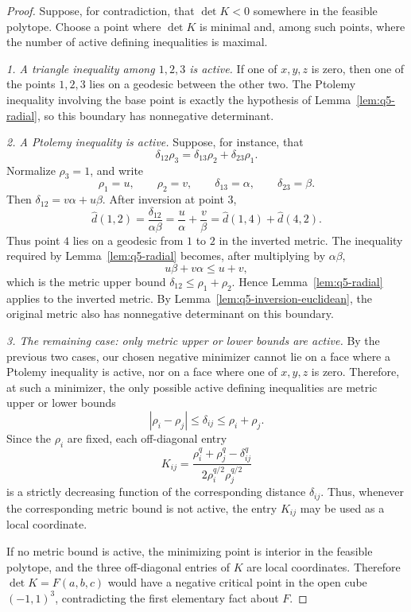 \documentclass[12pt]{amsart}
\theoremstyle{definition}
\newcommand{\1}{\mathbf{1}}
\begin{document}
\begin{proof}
Suppose, for contradiction, that $\det K<0$ somewhere in the feasible polytope.
Choose a point where $\det K$ is minimal and, among such points, where the number of
active defining inequalities is maximal.

\smallskip
\noindent\emph{1. A triangle inequality among $1,2,3$ is active.}
If one of $x,y,z$ is zero, then one of the points $1,2,3$ lies on a geodesic
between the other two.  The Ptolemy inequality involving the base point is exactly the
hypothesis of Lemma~\ref{lem:q5-radial}, so this boundary has nonnegative determinant.

\smallskip
\noindent\emph{2. A Ptolemy inequality is active.}
Suppose, for instance, that
\[
        \delta_{12}\rho_3=\delta_{13}\rho_2+\delta_{23}\rho_1.
\]
Normalize $\rho_3=1$, and write
\[
        \rho_1=u,\qquad
        \rho_2=v,\qquad
        \delta_{13}=\alpha,\qquad
        \delta_{23}=\beta.
\]
Then $\delta_{12}=v\alpha+u\beta$.  After inversion at point $3$,
\[
        \widehat d(1,2)=\frac{\delta_{12}}{\alpha\beta}
        =\frac{u}{\alpha}+\frac{v}{\beta}
        =\widehat d(1,4)+\widehat d(4,2).
\]
Thus point $4$ lies on a geodesic from $1$ to $2$ in the inverted metric.  The
inequality required by Lemma~\ref{lem:q5-radial} becomes, after multiplying by
$\alpha\beta$,
\[
        u\beta+v\alpha\le u+v,
\]
which is the metric upper bound $\delta_{12}\le\rho_1+\rho_2$.  Hence
Lemma~\ref{lem:q5-radial} applies to the inverted metric.  By
Lemma~\ref{lem:q5-inversion-euclidean}, the original metric also has nonnegative
determinant on this boundary.

\smallskip
\noindent\emph{3. The remaining case: only metric upper or lower bounds are active.}
By the previous two cases, our chosen negative minimizer cannot lie on a face where
a Ptolemy inequality is active, nor on a face where one of $x,y,z$ is zero.  Therefore,
at such a minimizer, the only possible active defining inequalities are metric upper or
lower bounds
\[
        |\rho_i-\rho_j|\le \delta_{ij}\le \rho_i+\rho_j.
\]
Since the $\rho_i$ are fixed, each off-diagonal entry
\[
        K_{ij}
        =
        \frac{\rho_i^q+\rho_j^q-\delta_{ij}^q}
        {2\rho_i^{q/2}\rho_j^{q/2}}
\]
is a strictly decreasing function of the corresponding distance $\delta_{ij}$.  Thus,
whenever the corresponding metric bound is not active, the entry $K_{ij}$ may be used
as a local coordinate.

If no metric bound is active, the minimizing point is interior in the feasible polytope,
and the three off-diagonal entries of $K$ are local coordinates.  Therefore
$\det K=F(a,b,c)$ would have a negative critical point in the open cube
$(-1,1)^3$, contradicting the first elementary fact about $F$.


\end{proof}
\end{document}
